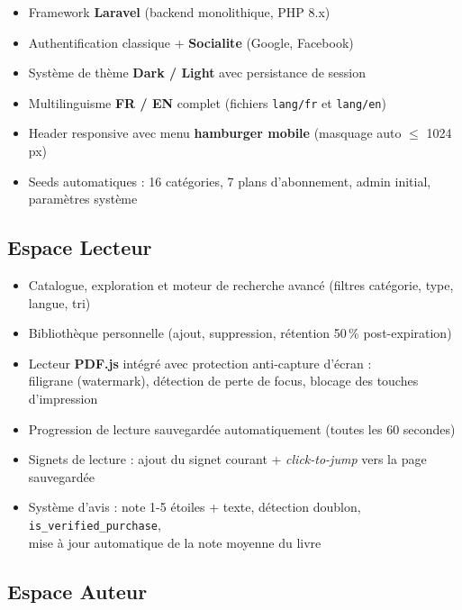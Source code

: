 \documentclass[12pt,a4paper]{article}
\newcommand{\cmark}{\textcolor{Vert}{\ding{51}}}
\begin{document}
\begin{itemize}
  \item[\cmark] Framework \textbf{Laravel} (backend monolithique, PHP 8.x)
  \item[\cmark] Authentification classique + \textbf{Socialite} (Google, Facebook)
  \item[\cmark] Système de thème \textbf{Dark / Light} avec persistance de session
  \item[\cmark] Multilinguisme \textbf{FR / EN} complet (fichiers \texttt{lang/fr} et \texttt{lang/en})
  \item[\cmark] Header responsive avec menu \textbf{hamburger mobile} (masquage auto $\leq$ 1024 px)
  \item[\cmark] Seeds automatiques : 16 catégories, 7 plans d'abonnement, admin initial, paramètres système
\end{itemize}

\subsection{Espace Lecteur}

\begin{itemize}
  \item[\cmark] Catalogue, exploration et moteur de recherche avancé (filtres catégorie, type, langue, tri)
  \item[\cmark] Bibliothèque personnelle (ajout, suppression, rétention 50\,\% post-expiration)
  \item[\cmark] Lecteur \textbf{PDF.js} intégré avec protection anti-capture d'écran :\\
        filigrane (watermark), détection de perte de focus, blocage des touches d'impression
  \item[\cmark] Progression de lecture sauvegardée automatiquement (toutes les 60 secondes)
  \item[\cmark] Signets de lecture : ajout du signet courant + \emph{click-to-jump} vers la page sauvegardée
  \item[\cmark] Système d'avis : note 1-5 étoiles + texte, détection doublon, \texttt{is\_verified\_purchase},\\
        mise à jour automatique de la note moyenne du livre
\end{itemize}

\subsection{Espace Auteur}
\end{document}
